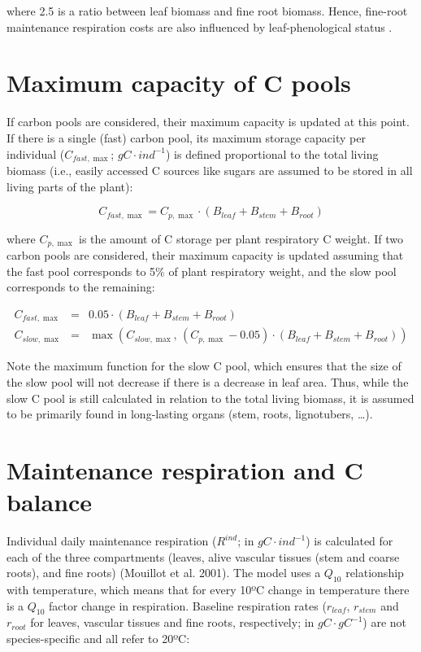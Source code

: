 \documentclass[]{book}
\begin{document}
where 2.5 is a ratio between leaf biomass and fine root biomass. Hence,
fine-root maintenance respiration costs are also influenced by
leaf-phenological status \citep{Sitch2003}.

\section{Maximum capacity of C pools}\label{maximum-capacity-of-c-pools}

If carbon pools are considered, their maximum capacity is updated at
this point. If there is a single (fast) carbon pool, its maximum storage
capacity per individual (\(C_{fast,\max}\); \(g C·ind^{-1}\)) is defined
proportional to the total living biomass (i.e., easily accessed C
sources like sugars are assumed to be stored in all living parts of the
plant):

\begin{equation}
C_{fast,\max} = C_{p,\max} \cdot (B_{leaf} + B_{stem} + B_{root})
\end{equation}

where \(C_{p,\max}\) is the amount of C storage per plant respiratory C
weight. If two carbon pools are considered, their maximum capacity is
updated assuming that the fast pool corresponds to 5\% of plant
respiratory weight, and the slow pool corresponds to the remaining:

\begin{eqnarray}
C_{fast,\max} &=& 0.05 \cdot (B_{leaf} + B_{stem} + B_{root})\\
C_{slow,\max} &=& \max \left(C_{slow,\max},\, (C_{p, \max}-0.05) \cdot (B_{leaf} + B_{stem} + B_{root})\right)
\end{eqnarray}

Note the maximum function for the slow C pool, which ensures that the
size of the slow pool will not decrease if there is a decrease in leaf
area. Thus, while the slow C pool is still calculated in relation to the
total living biomass, it is assumed to be primarily found in
long-lasting organs (stem, roots, lignotubers, \ldots{}).

\section{Maintenance respiration and C
balance}\label{maintenance-respiration-and-c-balance}

Individual daily maintenance respiration (\(R^{ind}\); in
\(g C·ind^{-1}\)) is calculated for each of the three compartments
(leaves, alive vascular tissues (stem and coarse roots), and fine roots)
(Mouillot et al. 2001). The model uses a \(Q_{10}\) relationship with
temperature, which means that for every 10ºC change in temperature there
is a \(Q_{10}\) factor change in respiration. Baseline respiration rates
(\(r_{leaf}\), \(r_{stem}\) and \(r_{root}\) for leaves, vascular
tissues and fine roots, respectively; in \(gC·gC^{-1}\)) are not
species-specific and all refer to 20ºC:
\end{document}
